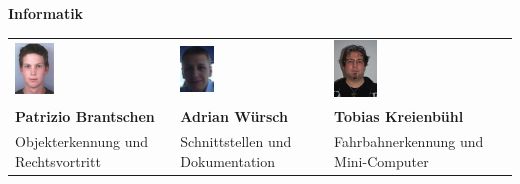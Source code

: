\newpage
\large
\textbf{Informatik}
\begin{table}[H]
\begin{tabular}{p{}p{}p{}}	
	\includegraphics[width=0.26\textwidth]{./04_Projektmanagement/fig/patriziobrantschen.jpg}	&	\includegraphics[width=0.24\textwidth]{./04_Projektmanagement/fig/adrianwuersch.jpg} &
	\includegraphics[width=0.25\textwidth]{./04_Projektmanagement/fig/tobiaskreienbuehl.jpg} 
	\\
	\textbf{Patrizio Brantschen} & 	
	\textbf{Adrian Würsch} &
	\textbf{Tobias Kreienbühl}
	\\
	Objekterkennung und Rechtsvortritt &
	Schnittstellen und Dokumentation &
	Fahrbahnerkennung und Mini-Computer
\end{tabular}
\end{table}








